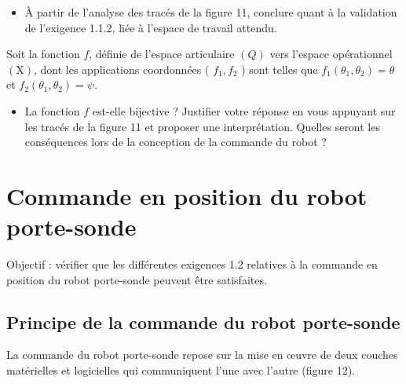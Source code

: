 \begin{itemize}
  \item[Q9.] À partir de l'analyse des tracés de la figure 11, conclure quant à la validation de l'exigence 1.1.2, liée à l'espace de travail attendu.
\end{itemize}

Soit la fonction $f$, définie de l'espace articulaire $(Q)$ vers l'espace opérationnel $(\mathrm{X})$, dont les applications coordonnées ( $f_{1}, f_{2}$ ) sont telles que $f_{1}\left(\theta_{1}, \theta_{2}\right)=\theta$ et $f_{2}\left(\theta_{1}, \theta_{2}\right)=\psi$.

\begin{itemize}
  \item[Q10.] La fonction $f$ est-elle bijective ? Justifier votre réponse en vous appuyant sur les tracés de la figure 11 et proposer une interprétation. Quelles seront les conséquences lors de la conception de la commande du robot ?
\end{itemize}

\section{Commande en position du robot porte-sonde}
Objectif : vérifier que les différentes exigences 1.2 relatives à la commande en position du robot porte-sonde peuvent être satisfaites.

\subsection{Principe de la commande du robot porte-sonde}
La commande du robot porte-sonde repose sur la mise en œuvre de deux couches matérielles et logicielles qui communiquent l'une avec l'autre (figure 12).

